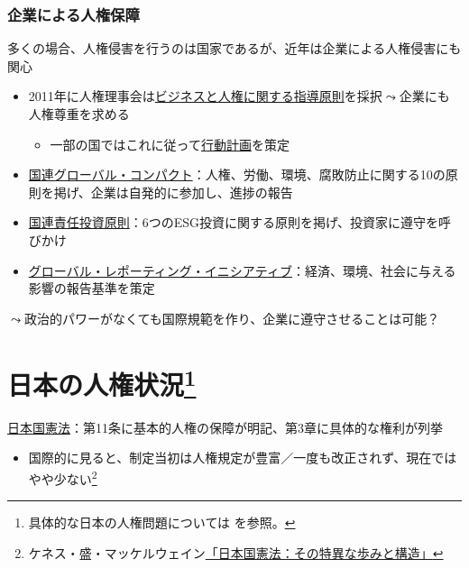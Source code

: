 \documentclass[
  xelatex,
  ja=standard]{bxjsarticle}
\providecommand{\tightlist}{%
  \setlength{\itemsep}{0pt}\setlength{\parskip}{0pt}}\usepackage{longtable,booktabs,array}
\begin{document}
\hypertarget{ux4f01ux696dux306bux3088ux308bux4ebaux6a29ux4fddux969c}{%
\subsubsection{企業による人権保障}\label{ux4f01ux696dux306bux3088ux308bux4ebaux6a29ux4fddux969c}}

多くの場合、人権侵害を行うのは国家であるが、近年は企業による人権侵害にも関心

\begin{itemize}
\tightlist
\item
  2011年に人権理事会は\href{https://www.mofa.go.jp/mofaj/gaiko/bhr/index.html}{ビジネスと人権に関する指導原則}を採択\(\leadsto\)企業にも人権尊重を求める

  \begin{itemize}
  \tightlist
  \item
    一部の国ではこれに従って\href{https://www.ohchr.org/en/special-procedures/wg-business/national-action-plans-business-and-human-rights}{行動計画}を策定
  \end{itemize}
\item
  \href{https://www.unglobalcompact.org/}{国連グローバル・コンパクト}：人権、労働、環境、腐敗防止に関する10の原則を掲げ、企業は自発的に参加し、進捗の報告
\item
  \href{https://www.unpri.org/}{国連責任投資原則}：6つのESG投資に関する原則を掲げ、投資家に遵守を呼びかけ
\item
  \href{https://www.globalreporting.org/}{グローバル・レポーティング・イニシアティブ}：経済、環境、社会に与える影響の報告基準を策定
\end{itemize}

\(\leadsto\)政治的パワーがなくても国際規範を作り、企業に遵守させることは可能？

\hypertarget{ux65e5ux672cux306eux4ebaux6a29ux72b6ux6cc1}{%
\section[日本の人権状況]{\texorpdfstring{日本の人権状況\footnote{具体的な日本の人権問題については
  \citet{shin2020} を参照。}}{日本の人権状況}}\label{ux65e5ux672cux306eux4ebaux6a29ux72b6ux6cc1}}

\href{https://elaws.e-gov.go.jp/document?lawid=321CONSTITUTION}{日本国憲法}：第11条に基本的人権の保障が明記、第3章に具体的な権利が列挙

\begin{itemize}
\tightlist
\item
  国際的に見ると、制定当初は人権規定が豊富／一度も改正されず、現在ではやや少ない\footnote{ケネス・盛・マッケルウェイン\href{https://www.nippon.com/ja/in-depth/a05602/}{「日本国憲法：その特異な歩みと構造」}}
\end{itemize}
\end{document}
